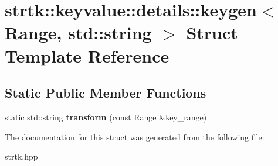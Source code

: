 \hypertarget{structstrtk_1_1keyvalue_1_1details_1_1keygen_3_01Range_00_01std_1_1string_01_4}{\section{strtk\-:\-:keyvalue\-:\-:details\-:\-:keygen$<$ Range, std\-:\-:string $>$ Struct Template Reference}
\label{structstrtk_1_1keyvalue_1_1details_1_1keygen_3_01Range_00_01std_1_1string_01_4}
}
\subsection*{Static Public Member Functions}
\begin{DoxyCompactItemize}
\item 
\hypertarget{structstrtk_1_1keyvalue_1_1details_1_1keygen_3_01Range_00_01std_1_1string_01_4_ace36d7845bc697d854910707228ca930}{static std\-::string {\bfseries transform} (const Range \&key\-\_\-range)}\label{structstrtk_1_1keyvalue_1_1details_1_1keygen_3_01Range_00_01std_1_1string_01_4_ace36d7845bc697d854910707228ca930}

\end{DoxyCompactItemize}


The documentation for this struct was generated from the following file\-:\begin{DoxyCompactItemize}
\item 
strtk.\-hpp\end{DoxyCompactItemize}
